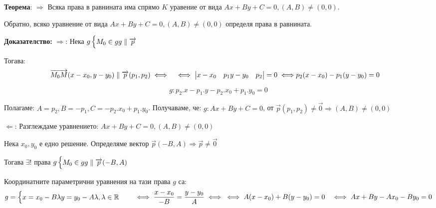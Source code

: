 \documentclass{article}
\renewcommand{\\}{\newline}
\newcommand{\doc}{\textbf{Доказателство: }}
\begin{document}
\textbf{Теорема}: \(\Rightarrow\)  Всяка права в равнината има спрямо \(K\) уравение от вида \(Ax + By + C = 0, (A, B) \not= (0, 0)\). 

Обратно, всяко уравнение от вида \(Ax+By+C =0, (A, B) \not=(0,0)\) определя права в равнината.

\doc \(\Rightarrow\):  Нека \(g \begin{cases} M_{0} \in g \\ g \parallel \overrightarrow{p}\end{cases}\)

Тогава:
\begin{align*}
  \overrightarrow{M_0M}(x-x_0, y-y_0) \parallel \overrightarrow{p}(p_1, p_2) &\iff \\
  &\iff \begin{vmatrix}
 x - x_0 & p_1\\
 y - y_0 & p_2
\end{vmatrix} = 0 \iff \\ 
  & p_2(x-x_0) - p_1(y-y_0) = 0
\end{align*}  

\[
  g: p_2.x - p_1.y - p_2.x_0 + p_1.y_0 = 0
\] 

Полагаме: \(A = p_2, B = -p_1, C = -p_2.x_0 + p_1.y_0\). Получаваме, че: \(g: Ax + By + C = 0\), от \(\overrightarrow{p}(p_1, p_2)\not=\overrightarrow{0} \Rightarrow (A, B) \not= (0,0)\)   

\(\Leftarrow\): Разглеждаме уравнението: \(Ax+By+C = 0, (A, B) \not= (0,0)\)   

Нека \(x_0, y_0\) е едно решение. Определяме вектор \(\overrightarrow{p}(-B, A) \Rightarrow \overrightarrow{p} \not= \overrightarrow{0}\) 

Тогава \(\exists !\) права \(g \begin{cases} M_{0} \in g \\ g \parallel \overrightarrow{p}(-B,A) \end{cases}\)   

Координатните параметрични уравнения на тази права \(g\) са: 
\begin{align*}
& g= \begin{cases}
  x = x_0 - B \lambda \\ 
  y = y_0 - A \lambda, \lambda \in \mathbb{R}
\end{cases}
\\ &\iff \frac{x-x_0}{-B} = \frac{y - y_0}{A} \iff  \\ 
   &\iff A(x-x_0) + B(y-y_0) = 0 \\ 
   &\iff Ax + By - Ax_0 - By_0 = 0
\end{align*}
\end{document}
